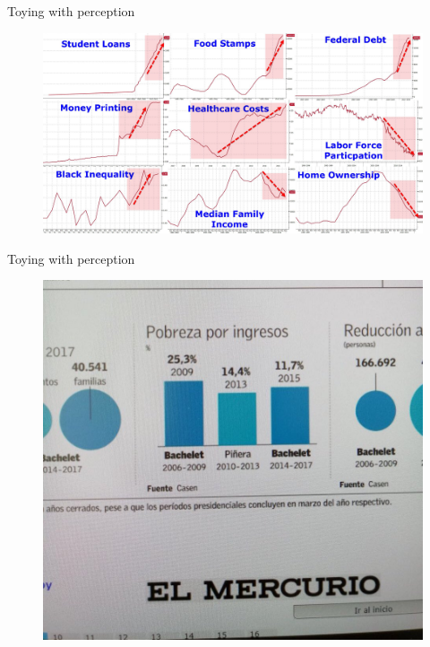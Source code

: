 \documentclass[12pt,english,pdf,dvipsnames,handout]{beamer}
\begin{document}
\begin{frame}{Toying with perception}
	
	\begin{figure}
		\centering
		\includegraphics[scale=0.11]{../04-graphs/33_Trump_plot_enlarged}
	\end{figure}
	
\end{frame}


\begin{frame}{Toying with perception}
	
	\begin{figure}
		\centering
		\includegraphics[scale=0.24]{../04-graphs/40_Mercurio_Chile_statistics}
	\end{figure}
	
\end{frame}
\end{document}
